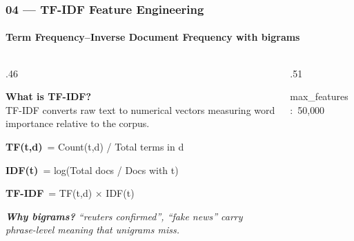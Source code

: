\documentclass[aspectratio=169,10pt]{beamer}
\begin{document}
\begin{frame}[t]
\frametitle{04 --- TF-IDF Feature Engineering}
\framesubtitle{Term Frequency--Inverse Document Frequency with bigrams}
\vspace{-0.5cm}
\begin{columns}[T]
\begin{column}{.46\textwidth}
  \begin{tcolorbox}[mycard={BlueMid}{ABlue}]
    {\footnotesize\textbf{What is TF-IDF?}}\\[3pt]
    {\scriptsize TF-IDF converts raw text to numerical vectors measuring word importance
    relative to the corpus.}\\[5pt]
    \begin{tcolorbox}[mycard={ABlue}{ABlue},colback=BlueL,top=2pt,bottom=2pt]
      \textbf{\textcolor{ABlue}{TF(t,d)}}\ {\scriptsize\color{Navy}= Count(t,d) / Total terms in d}
    \end{tcolorbox}\vspace{2pt}
    \begin{tcolorbox}[mycard={AGreen}{AGreen},colback=GreenL,top=2pt,bottom=2pt]
      \textbf{\textcolor{AGreen}{IDF(t)}}\ {\scriptsize\color{Navy}= log(Total docs / Docs with t)}
    \end{tcolorbox}\vspace{2pt}
    \begin{tcolorbox}[mycard={APurple}{APurple},colback=PurpleL,top=2pt,bottom=2pt]
      \textbf{\textcolor{APurple}{TF-IDF}}\ {\scriptsize\color{Navy}= TF(t,d) $\times$ IDF(t)}
    \end{tcolorbox}
\vspace{.06cm}
    \begin{tcolorbox}[sideline={AOrange},top=2pt,bottom=2pt]
      {\scriptsize\textit{\textbf{Why bigrams?} ``reuters confirmed'', ``fake news'' carry
      phrase-level meaning that unigrams miss.}}
    \end{tcolorbox}
  \end{tcolorbox}
\end{column}
\begin{column}{.51\textwidth}
  \begin{tcolorbox}[codeblock,title={\textbf{TfidfVectorizer Config}},
      colbacktitle=Navy,coltitle=ABlue,fonttitle=\scriptsize\bfseries]
    \textcolor{CodeGray}{max\_features}\ :\ \textcolor{ABlue}{50{,}000}\\

\end{tcolorbox}
\end{column}
\end{columns}
\end{frame}
\end{document}
